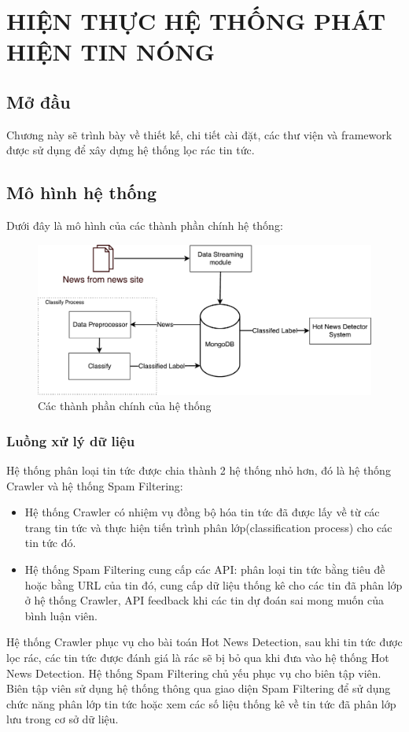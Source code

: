 \chapter{HIỆN THỰC HỆ THỐNG PHÁT HIỆN TIN NÓNG}
\ifpdf
    \graphicspath{{Chapter3/Chapter3Figs/PNG/}{Chapter3/Chapter3Figs/PDF/}{Chapter3/Chapter3Figs/}}
\else
    \graphicspath{{Chapter3/Chapter3Figs/EPS/}{Chapter3/Chapter3Figs/}}
\fi

\section{Mở đầu}
Chương này sẽ trình bày về thiết kế, chi tiết cài đặt, các thư viện và framework được sử dụng để xây dựng hệ thống lọc rác tin tức.

\section{Mô hình hệ thống}
Dưới đây là mô hình của các thành phần chính hệ thống:
\begin{figure}[H]
	\centering
	\includegraphics[width=0.9\linewidth]{Chapter3/Chapter3Figs/PDF/SystemArchitecture}
	\caption{Các thành phần chính của hệ thống}
	\label{fig:systemarchitecture}
\end{figure}
\subsection{Luồng xử lý dữ liệu}
	Hệ thống phân loại tin tức được chia thành 2 hệ thống nhỏ hơn, đó là hệ thống Crawler và hệ thống Spam Filtering: 
	\begin{itemize}
		\item Hệ thống Crawler có nhiệm vụ đồng bộ hóa tin tức đã được lấy về từ các trang tin tức và thực hiện tiến trình phân lớp(classification process) cho các tin tức đó.
		\item Hệ thống Spam Filtering cung cấp các API: phân loại tin tức bằng tiêu đề hoặc bằng URL của tin đó, cung cấp dữ liệu thống kê cho các tin đã phân lớp ở hệ thống Crawler, API feedback khi các tin dự đoán sai mong muốn của bình luận viên.
	\end{itemize}
Hệ thống Crawler phục vụ cho bài toán Hot News Detection, sau khi tin tức được lọc rác, các tin tức được đánh giá là rác sẽ bị bỏ qua khi đưa vào hệ thống Hot News Detection.
Hệ thống Spam Filtering chủ yếu phục vụ cho biên tập viên. Biên tập viên sử dụng hệ thống thông qua giao diện Spam Filtering để sử dụng chức năng phân lớp tin tức hoặc xem các số liệu thống kê về tin tức đã phân lớp lưu trong cơ sở dữ liệu.
